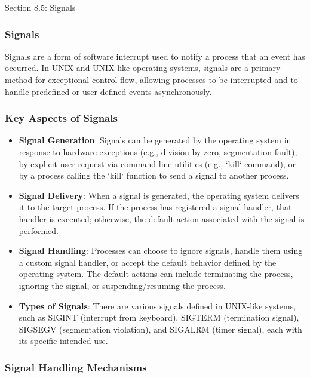 \begin{notes}{Section 8.5: Signals}
    \subsubsection*{Signals}

    Signals are a form of software interrupt used to notify a process that an event has occurred. In UNIX and UNIX-like operating systems, signals are a primary method for exceptional control flow, 
    allowing processes to be interrupted and to handle predefined or user-defined events asynchronously. \vspace*{1em}
    
    \subsubsection*{Key Aspects of Signals}
    
    \begin{itemize}
        \item \textbf{Signal Generation}: Signals can be generated by the operating system in response to hardware exceptions (e.g., division by zero, segmentation fault), by explicit user request 
        via command-line utilities (e.g., `kill` command), or by a process calling the `kill` function to send a signal to another process.
        \item \textbf{Signal Delivery}: When a signal is generated, the operating system delivers it to the target process. If the process has registered a signal handler, that handler is executed; 
        otherwise, the default action associated with the signal is performed.
        \item \textbf{Signal Handling}: Processes can choose to ignore signals, handle them using a custom signal handler, or accept the default behavior defined by the operating system. The default 
        actions can include terminating the process, ignoring the signal, or suspending/resuming the process.
        \item \textbf{Types of Signals}: There are various signals defined in UNIX-like systems, such as SIGINT (interrupt from keyboard), SIGTERM (termination signal), SIGSEGV (segmentation violation), 
        and SIGALRM (timer signal), each with its specific intended use.
    \end{itemize}
    
    \subsubsection*{Signal Handling Mechanisms}
    

\end{notes}
